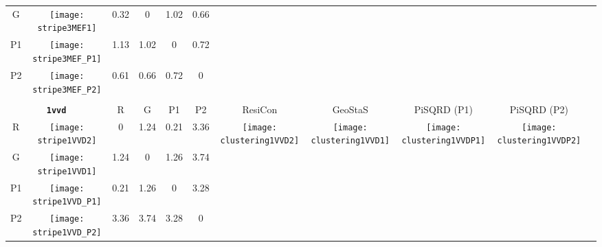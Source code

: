 \documentclass[a4paper,11pt,twoside]{book}%
\begin{document}
\begin{appendices}
\begin{sidewaystable}[h!]
\begin{tabular*}{4cm}{cc|c|c|c|c|c|c|c|c|c|}
\cline{1-6}
\multicolumn{1}{|c|}{G} & \texttt{[image: stripe3MEF1]} & 0.32 & 0 & 1.02 & 0.66 & \multirow{4}{*}{} & \multirow{4}{*}{} & \multirow{4}{*}{} & \multirow{4}{*}{} & \multirow{5}{*}{} \\
\cline{1-6}
\multicolumn{1}{|c|}{P1} & \texttt{[image: stripe3MEF\_P1]} & 1.13 & 1.02 & 0 & 0.72 & \multirow{4}{*}{} & \multirow{4}{*}{} & \multirow{4}{*}{} & \multirow{4}{*}{} & \multirow{5}{*}{}  \\
\cline{1-6}
\multicolumn{1}{|c|}{P2} & \texttt{[image: stripe3MEF\_P2]} & 0.61 & 0.66 & 0.72 & 0 & \multirow{4}{*}{} & \multirow{4}{*}{} & \multirow{4}{*}{} & \multirow{4}{*}{} & \multirow{5}{*}{}  \\
\cline{1-11}
\\
\cline{1-11}
\multicolumn{2}{|c|}{{\bf \texttt{1vvd}}} & R & G & P1 & P2 & ResiCon & GeoStaS & PiSQRD (P1) & PiSQRD (P2) & \multirow{5}{*}{\vspace{-0.15cm}\texttt{[image: threeHistogram1VVD]}}  \\
\cline{1-10}
\multicolumn{1}{|c|}{R} & \texttt{[image: stripe1VVD2]} & 0 & 1.24 & 0.21 & 3.36 & \multirow{4}{*}{\vspace{-0.3cm}\texttt{[image: clustering1VVD2]}} & \multirow{4}{*}{\vspace{-0.3cm}\texttt{[image: clustering1VVD1]}} & \multirow{4}{*}{\vspace{-0.3cm}\texttt{[image: clustering1VVDP1]}} & \multirow{4}{*}{\vspace{-0.3cm}\texttt{[image: clustering1VVDP2]}} &  \multirow{5}{*}{} \\
\cline{1-6}
\multicolumn{1}{|c|}{G} & \texttt{[image: stripe1VVD1]} & 1.24 & 0 & 1.26 & 3.74 & \multirow{4}{*}{} & \multirow{4}{*}{} & \multirow{4}{*}{} & \multirow{4}{*}{} & \multirow{5}{*}{} \\
\cline{1-6}
\multicolumn{1}{|c|}{P1} & \texttt{[image: stripe1VVD\_P1]} & 0.21 & 1.26 & 0 & 3.28 & \multirow{4}{*}{} & \multirow{4}{*}{} & \multirow{4}{*}{} & \multirow{4}{*}{} & \multirow{5}{*}{}  \\
\cline{1-6}
\multicolumn{1}{|c|}{P2} & \texttt{[image: stripe1VVD\_P2]} & 3.36 & 3.74 & 3.28 & 0 & \multirow{4}{*}{} & \multirow{4}{*}{} & \multirow{4}{*}{} & \multirow{4}{*}{} & \multirow{5}{*}{}  \\
\cline{1-11}
\end{tabular*}
\normalfont
\end{sidewaystable}




\end{appendices}
\end{document}
